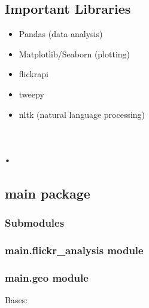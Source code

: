 \documentclass[letterpaper,10pt,english]{sphinxmanual}
\begin{document}
\section{Important Libraries}
\label{main/code:important-libraries}\begin{itemize}
\item {} 
Pandas (data analysis)

\item {} 
Matplotlib/Seaborn (plotting)

\item {} 
flickrapi

\item {} 
tweepy

\item {} 
nltk (natural language processing)

\end{itemize}


\chapter{.}
\label{modules::doc}\label{modules:id1}

\section{main package}
\label{main::doc}\label{main:main-package}

\subsection{Submodules}
\label{main:submodules}

\subsection{main.flickr\_analysis module}
\label{main:main-flickr-analysis-module}

\subsection{main.geo module}
\label{main:main-geo-module}\label{main:module-main.geo}

\begin{fulllineitems}
\label{main:main.geo.BoundingBox}
Bases: 

\end{fulllineitems}
\end{document}
